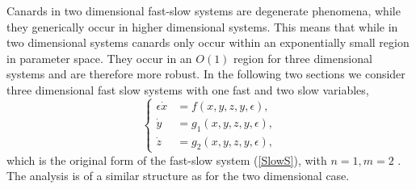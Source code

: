 Canards in two dimensional fast-slow systems are degenerate phenomena, while they generically occur in higher dimensional systems.
This means that while in two dimensional systems canards only occur within an exponentially small region in parameter space. They occur in an $O(1)$ region for three dimensional systems and are therefore more robust. In the following two sections we consider three dimensional fast slow systems with one fast and two slow variables,
\begin{equation}
\begin{cases}
\epsilon \dot{x} &=f(x,y,z,y,\epsilon),\\
\dot{y}&=g_1(x,y,z,y,\epsilon),\\
\dot{z}&=g_2(x,y,z,y,\epsilon),
\end{cases}\label{eq: fs singularity system}
\end{equation}
which is the original form of the fast-slow system (\ref{SlowS}), with $n=1,m=2$ \citep{MMO}.
The analysis is of a similar structure as for the two dimensional case.\\

